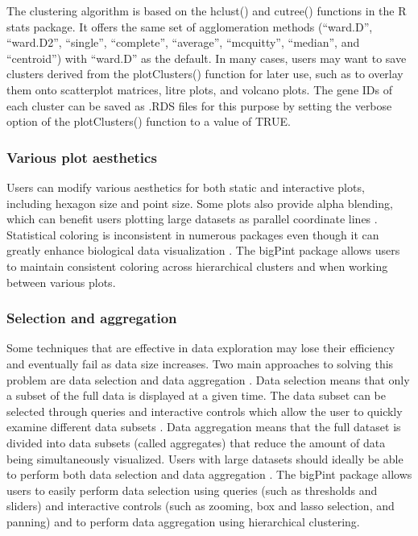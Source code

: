 \documentclass[parskip=full]{bmcart}
\begin{document}
The clustering algorithm is based on the hclust() and cutree() functions in the R stats package. It offers the same set of agglomeration methods (``ward.D'', ``ward.D2'', ``single'', ``complete'', ``average'', ``mcquitty'', ``median'', and ``centroid'') with ``ward.D'' as the default. In many cases, users may want to save clusters derived from the plotClusters() function for later use, such as to overlay them onto scatterplot matrices, litre plots, and volcano plots. The gene IDs of each cluster can be saved as .RDS files for this purpose by setting the verbose option of the plotClusters() function to a value of TRUE.

\subsubsection*{Various plot aesthetics}

Users can modify various aesthetics for both static and interactive plots, including hexagon size and point size. Some plots also provide alpha blending, which can benefit users plotting large datasets as parallel coordinate lines \cite{unwin2007computational}. Statistical coloring is inconsistent in numerous packages even though it can greatly enhance biological data visualization \cite{yin2012ggbio}. The bigPint package allows users to maintain consistent coloring across hierarchical clusters and when working between various plots.

\subsubsection*{Selection and aggregation}

Some techniques that are effective in data exploration may lose their efficiency and eventually fail as data size increases. Two main approaches to solving this problem are data selection and data aggregation \cite{andrienko2005blending}. Data selection means that only a subset of the full data is displayed at a given time. The data subset can be selected through queries and interactive controls which allow the user to quickly examine different data subsets \cite{andrienko2005blending}. Data aggregation means that the full dataset is divided into data subsets (called aggregates) that reduce the amount of data being simultaneously visualized. Users with large datasets should ideally be able to perform both data selection and data aggregation \cite{andrienko2005blending}. The bigPint package allows users to easily perform data selection using queries (such as thresholds and sliders) and interactive controls (such as zooming, box and lasso selection, and panning) and to perform data aggregation using hierarchical clustering. 
\end{document}
